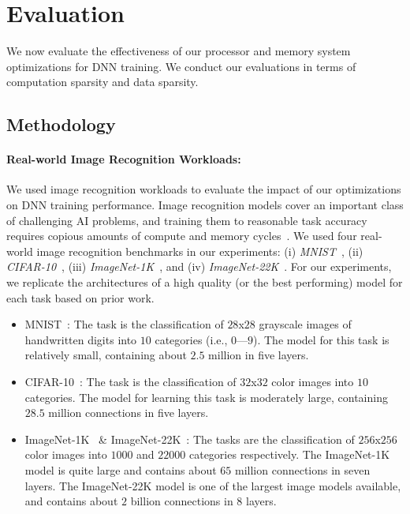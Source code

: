 \section{Evaluation}
\label{sec:eval}
We now evaluate the effectiveness of our processor and memory system optimizations for DNN training.  We conduct our evaluations in terms of computation sparsity and data sparsity. 

 \subsection{Methodology}
 \label{subsec:eval_method}
 
 \paragraph{Real-world Image Recognition Workloads:} We used image recognition workloads to evaluate the impact of our optimizations on DNN training performance.  Image recognition models cover an important class of challenging AI problems, and training them to reasonable task accuracy requires copious amounts of compute and memory cycles~\cite{Krizhevsky12, Le12, Dean12, Chilimbi14}.  We used four real-world image recognition benchmarks in our experiments: (i) {\it MNIST}~\cite{Lecun98}, (ii) {\it CIFAR-10}~\cite{KrizhevskyThesis}, (iii) {\it ImageNet-1K}~\cite{imagenet09}, and (iv) {\it ImageNet-22K}~\cite{imagenet09}.  For our experiments, we replicate the architectures of a high quality (or the best performing) model for each task based on  prior work.  

\begin{itemize}
\item MNIST~\cite{Chilimbi14}: The task is the classification of $28$x$28$ grayscale images of handwritten digits into $10$ categories (i.e., $0$---$9$).  The model for this task is relatively small, containing about $2.5$ million in five layers.  

\item CIFAR-10~\cite{Srivastava14a}: The task is the classification of $32$x$32$ color images into $10$ categories. The model for learning this task is moderately large, containing $28.5$ million connections in five layers.

\item ImageNet-1K~\cite{Krizhevsky12} \& ImageNet-22K~\cite{Chilimbi14}: The tasks are the classification of $256$x$256$ color images into $1000$ and $22000$ categories respectively. The ImageNet-1K model is quite large and contains about $65$ million connections in seven layers.  The ImageNet-22K model is one of the largest image models available, and contains about $2$ billion connections in $8$ layers. 

\end{itemize} 


